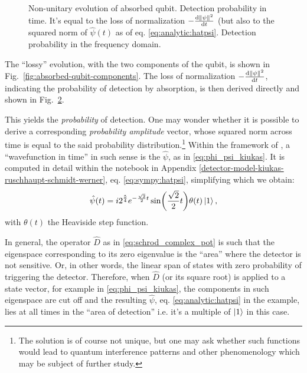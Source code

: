 \begin{figure}
\begin{subfigure}[b]{0.49\textwidth}
    \subcaption{}\label{fig:absorbed-qubit-normalization-loss:omega}
  \end{subfigure}
  \caption{
    Non-unitary evolution of absorbed qubit.
      Detection probability in time. It's equal to the
      loss of normalization $-\dv{\norm{\psi}^2}{t}$
      (but also to the squared norm of $\hat{\psi}(t)$ as of eq. \eqref{eq:analytic:hatpsi}.
      Detection probability in the frequency domain.
  }
  \label{fig:absorbed-qubit-normalization-loss}
\end{figure}

The ``lossy'' evolution, with the two components of the qubit, is shown in Fig.~\ref{fig:absorbed-qubit-components}.
The loss of normalization $-\dv{\norm{\psi}^2}{t}$, indicating the probability of detection by absorption,
is then derived directly and shown in Fig.~\ref{fig:absorbed-qubit-normalization-loss}.

This yields the \emph{probability} of detection.
One may wonder whether it is possible to derive a corresponding \emph{probability amplitude} vector,
whose squared norm across time is equal to the said probability distribution.\footnote{
  The solution is of course not unique, but one may ask whether such functions would lead
  to quantum interference patterns and other phenomenology which may be subject of further study.
}
Within the framework of \cite{RuschhauptAbsorption}, a ``wavefunction in time'' in such sense
is the $\hat{\psi}$, as in \eqref{eq:phi_psi_kiukas}.
It is computed in detail within the
notebook in Appendix \ref{detector-model-kiukas-ruschhaupt-schmidt-werner}, eq. \eqref{eq:sympy:hatpsi},
simplifying which we obtain:
\begin{equation}\label{eq:analytic:hatpsi}
  \hat{\psi}(t) =
    i 2^{\frac{5}{4}} e^{-\frac{\sqrt{2}}{2}t}\sin(\frac{\sqrt{2}}{2}t) \theta(t)
    \ket{1}
    \text{,}
\end{equation}
with $\theta(t)$ the Heaviside step function.

\begin{remark}\label{remark:detection_area}
In general, the operator $\hat{D}$ as in \eqref{eq:schrod_complex_pot}
is such that the eigenspace corresponding to its zero eigenvalue
is the ``area'' where the detector is not sensitive. Or, in other words,
the linear span of states with zero probability of triggering the detector.
Therefore, when $\hat{D}$ (or its square root) is applied to a state vector,
for example in \eqref{eq:phi_psi_kiukas},
the components in such eigenspace are cut off and the resulting
$\hat{\psi}$, eq. \eqref{eq:analytic:hatpsi} in the example, lies at all times in the ``area of detection''
i.e. it's a multiple of $\ket{1}$ in this case.
\end{remark}

